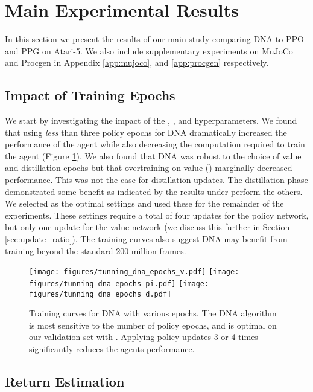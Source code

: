 \documentclass{article}
\begin{document}
\section{Main Experimental Results}
\label{sec:results}

In this section we present the results of our main study comparing DNA to PPO and PPG on Atari-5. We also include supplementary experiments on MuJoCo \cite{todorov2012mujoco} and Procgen \cite{cobbe2020leveraging} in Appendix \ref{app:mujoco}, and \ref{app:procgen} respectively. 

\subsection{Impact of Training Epochs}

We start by investigating the impact of the , , and  hyperparameters. We found that using \textit{less} than three policy epochs for DNA dramatically increased the performance of the agent while also decreasing the computation required to train the agent (Figure \ref{fig:dna_tuning}). We also found that DNA was robust to the choice of value and distillation epochs but that overtraining on value () marginally decreased performance. This was not the case for distillation updates. The distillation phase demonstrated some benefit as indicated by the  results under-perform the others. We selected  as the optimal settings and used these for the remainder of the experiments. These settings require a total of four updates for the policy network, but only one update for the value network (we discuss this further in Section \ref{sec:update_ratio}). The training curves also suggest DNA may benefit from training beyond the standard 200 million frames. 

\begin{figure}[t]
    \centering
    \texttt{[image: figures/tunning\_dna\_epochs\_v.pdf]}
    \texttt{[image: figures/tunning\_dna\_epochs\_pi.pdf]}
    \texttt{[image: figures/tunning\_dna\_epochs\_d.pdf]}
    \caption{Training curves for DNA with various epochs. The DNA algorithm is most sensitive to the number of policy epochs, and is optimal on our validation set with . Applying policy updates 3 or 4 times significantly reduces the agents performance.}
    \label{fig:dna_tuning}
\end{figure}

\subsection{Return Estimation}
\label{sec:results_re}
\end{document}
